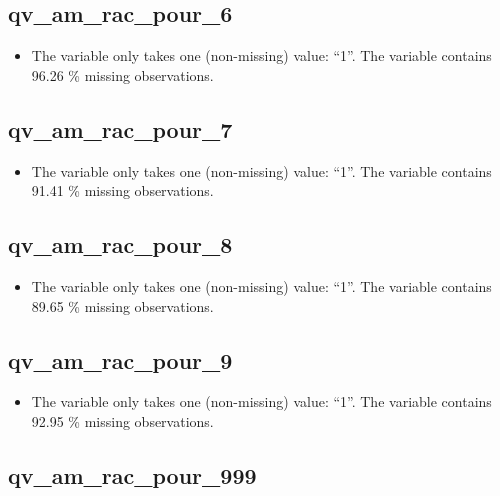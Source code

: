 \documentclass[
  letterpaper,
  DIV=11,
  numbers=noendperiod]{scrartcl}
\providecommand{\tightlist}{%
  \setlength{\itemsep}{0pt}\setlength{\parskip}{0pt}}
\begin{document}
\fullline

\subsection{qv\_am\_rac\_pour\_6}\label{qv_am_rac_pour_6}

\begin{itemize}
\tightlist
\item
  The variable only takes one (non-missing) value: ``1''. The variable
  contains 96.26 \% missing observations.
\end{itemize}

\fullline

\subsection{qv\_am\_rac\_pour\_7}\label{qv_am_rac_pour_7}

\begin{itemize}
\tightlist
\item
  The variable only takes one (non-missing) value: ``1''. The variable
  contains 91.41 \% missing observations.
\end{itemize}

\fullline

\subsection{qv\_am\_rac\_pour\_8}\label{qv_am_rac_pour_8}

\begin{itemize}
\tightlist
\item
  The variable only takes one (non-missing) value: ``1''. The variable
  contains 89.65 \% missing observations.
\end{itemize}

\fullline

\subsection{qv\_am\_rac\_pour\_9}\label{qv_am_rac_pour_9}

\begin{itemize}
\tightlist
\item
  The variable only takes one (non-missing) value: ``1''. The variable
  contains 92.95 \% missing observations.
\end{itemize}

\fullline

\subsection{qv\_am\_rac\_pour\_999}\label{qv_am_rac_pour_999}
\end{document}
